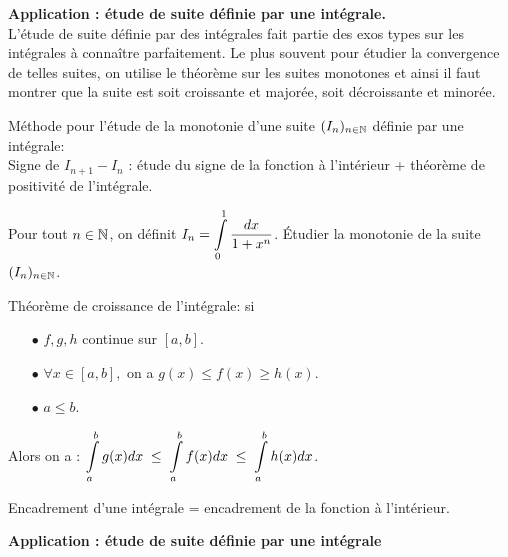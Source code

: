 \documentclass[a4paper, 11pt]{article}
\begin{document}
{{\textbf{Application : \'etude de suite d\'efinie par une int\'egrale.}\\
L'\'etude de suite d\'efinie par des int\'egrales fait partie des exos types sur les int\'egrales \`{a} conna\^{i}tre parfaitement. Le plus souvent pour \'etudier la convergence de telles suites, on utilise le th\'eor\`{e}me sur les suites monotones et ainsi il faut montrer que la suite est soit croissante et major\'ee, soit d\'ecroissante et minor\'ee.
\vsec\vsec



\begin{dboxminipage}{11cm}
	M\'ethode pour l'\'etude de la monotonie d'une suite $(I_n)_{n\in\mathbb{N}}$ d\'efinie par une int\'egrale:\\
	Signe de $I_{n+1}-I_n$ : \'etude du signe de la fonction \`a l'int\'erieur + th\'eor\`eme de positivit\'e de l'int\'egrale.
\end{dboxminipage}




{\footnotesize \begin{exo}
	Pour tout $n\in\mathbb{N}$, on d\'efinit $I_n=\displaystyle \int\limits_0^1 \displaystyle\frac{dx}{1+x^n}$. \'Etudier la monotonie de la suite $(I_n)_{n \in\mathbb{N}}$.
\end{exo}}
\vsec\vsec


{

	\begin{theorem} Th\'eor\`{e}me de croissance de l'int\'egrale: si
		\begin{itemize}
			\item[$\bullet$] $f,g,h$ continue sur $[a,b]$.
			\item[$\bullet$] $\forall x \in [a,b],$ on a  $g(x)\leq f(x) \geq h(x)$.
			\item[$\bullet$] $a\leq b$.
		\end{itemize}
		Alors on a : $\displaystyle \int\limits_a^b g(x)dx \; \leq \;  \int\limits_a^b f(x)dx \; \leq \; \int\limits_a^b h(x)dx$.\vsec
	\end{theorem}
}
\vsec\vsec

\begin{dboxminipage}{13cm}
	Encadrement d'une int\'egrale = encadrement de la fonction \`a l'int\'erieur.
\end{dboxminipage}


\vsec

{\textbf{Application : \'etude de suite d\'efinie par une int\'egrale}

}}}
\end{document}
